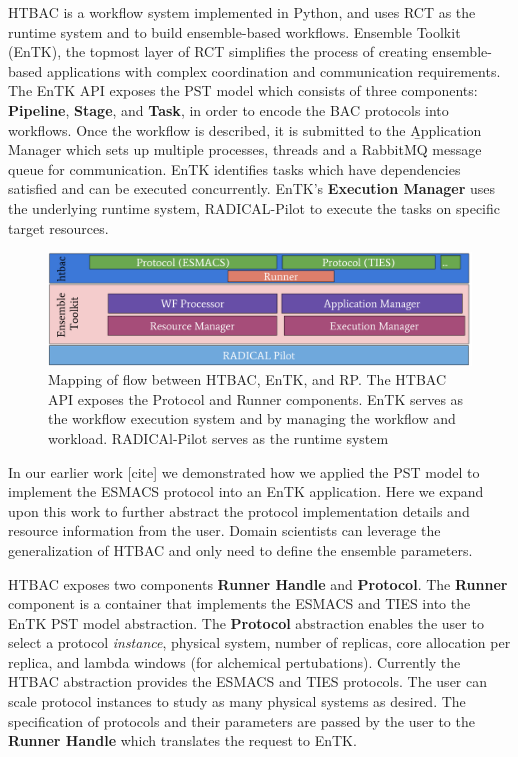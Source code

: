 HTBAC is a workflow system implemented in Python, and uses RCT as the runtime
system and to build ensemble-based workflows. Ensemble Toolkit (EnTK), the
topmost layer of RCT simplifies the process of creating ensemble-based
applications with complex coordination and communication requirements. The
EnTK API exposes the PST model which consists of three components:
\textbf{Pipeline}, \textbf{Stage}, and \textbf{Task}, in order to encode the
BAC protocols into workflows. Once the workflow is described, it is submitted
to the \b{Application Manager} which sets up multiple processes, threads and a
RabbitMQ message queue for communication. EnTK identifies tasks which have
dependencies satisfied and can be executed concurrently. EnTK's
\textbf{Execution Manager} uses the underlying runtime system, RADICAL-Pilot
to execute the tasks on specific target resources.


\begin{figure}
  \centering
   \includegraphics[width=\columnwidth]{figures/isc_htbac_integration_with_entk_RP.pdf}
  \caption{Mapping of flow between HTBAC, EnTK, and RP. The HTBAC API exposes the Protocol
  and Runner components. EnTK serves as the workflow execution system and
  by managing the workflow and workload. RADICAl-Pilot serves as the runtime system}
\label{fig:integration}
\end{figure}

	In our earlier work [cite] we demonstrated how we applied the PST model to
implement the ESMACS protocol into an EnTK application. Here we expand upon this
work to further abstract the protocol implementation details and resource
information from the user. Domain scientists can leverage the generalization
of HTBAC and only need to define the ensemble parameters.

	HTBAC exposes two components \textbf{Runner Handle} and \textbf{Protocol}.
The \textbf{Runner} component is a container that implements the ESMACS 
and TIES into the EnTK PST model abstraction. The \textbf{Protocol} 
abstraction enables the user to select a protocol \textit{instance}, physical
system, number of replicas, core allocation per replica, and lambda 
windows (for alchemical pertubations). Currently the HTBAC abstraction provides
the ESMACS and TIES protocols. The user can scale protocol instances to study as
many physical systems as desired. The specification of protocols and 
their parameters are passed by the user to the \textbf{Runner Handle} which 
translates the request to EnTK. 

